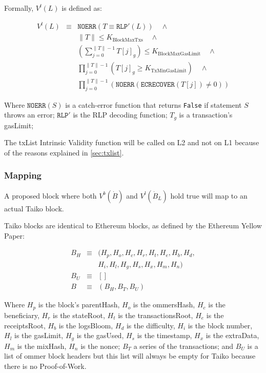 \documentclass[9pt,oneside]{amsart}
\begin{document}
\begin{multicols}{2}
Formally, $V^l(L)$ is defined as:

\begin{eqnarray}
V^l(L) & \equiv & \texttt{NOERR}(T \equiv \texttt{RLP}'(L))  \quad \wedge  \\
\nonumber& & \lVert T \rVert \le K_{\mathrm{BlockMaxTxs}} \quad \wedge \\
\nonumber & & (\sum_{j = 0}^{\lVert T \rVert - 1}T[j]_g) \le K_{\mathrm{BlockMaxGasLimit}} \quad \wedge \\
\nonumber & & \prod_{j = 0}^{\lVert T \rVert - 1} (T[j]_g \ge K_{\mathrm{TxMinGasLimit}})\quad \wedge \\
\nonumber & & \prod_{j = 0}^{\lVert T \rVert - 1} (\texttt{NOERR}(\texttt{ECRECOVER}(T[j]) \ne 0) )
\end{eqnarray}

Where $\texttt{NOERR}(S)$ is a catch-error function that returns \texttt{False} if statement $S$ throws an error; $\texttt{RLP}'$ is the RLP decoding function;  $T_g$ is a transaction's gasLimit; 

The txList Intrinsic Validity function will be called on L2 and not on L1 because of the reasons explained in \ref{sec:txlist}.

\subsubsection{Mapping}

A proposed block where both $V^b(\dot{B})$ and $V^l(\dot{B}_L)$ hold true will map to an actual Taiko block.

Taiko blocks are identical to Ethereum blocks, as defined by the Ethereum Yellow Paper\cite{yellow-paper}:

\begin{eqnarray}
B_H & \equiv & (H_p, H_o, H_c, H_r, H_t, H_e, H_b, H_d, \\
\nonumber & & H_i, H_l,H_g, H_s, H_x, H_m, H_n) \\
B_U  & \equiv & [] \\
B & \equiv & (B_H, B_T, B_U)
\end{eqnarray}

Where $H_p$ is the block's parentHash, $H_o$ is the ommersHash, $H_c$ is the beneficiary, $H_r$ is the stateRoot, $H_t$ is the transactionsRoot, $H_e$ is the receiptsRoot, $H_b$ is the logsBloom, $H_d$ is the difficulty, $H_i$ is the block number, $H_l$ is the gasLimit, $H_g$ is the gasUsed, $H_s$ is the timestamp, $H_x$ is the extraData, $H_m$ is the mixHash, $H_n$ is the nonce; $B_T$ a series of the transactions; and $B_U$ is a list of ommer block headers but this list will always be empty for Taiko because there is no Proof-of-Work.


\end{multicols}
\end{document}
